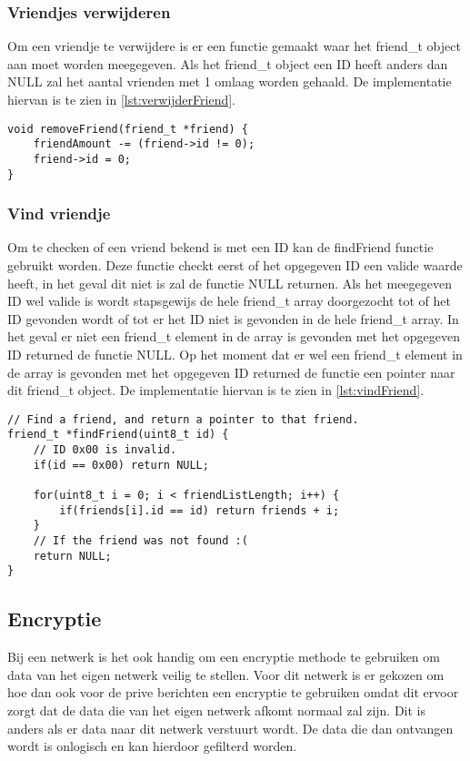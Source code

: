     \subsubsection{Vriendjes verwijderen}
        Om een vriendje te verwijdere is er een functie gemaakt waar het friend\_t object aan moet worden meegegeven. Als het friend\_t object een ID heeft anders dan NULL zal het aantal vrienden met 1 omlaag worden gehaald. De implementatie hiervan is te zien in \autoref{lst:verwijderFriend}.
        \begin{lstlisting}[caption={Verwijder vriendje},captionpos=b,label={lst:verwijderFriend},style=c,xleftmargin=.\textwidth,xrightmargin=.\textwidth]
void removeFriend(friend_t *friend) {
    friendAmount -= (friend->id != 0);
    friend->id = 0;
}
        \end{lstlisting}

    \subsubsection{Vind vriendje}
        Om te checken of een vriend bekend is met een ID kan de findFriend functie gebruikt worden. Deze functie checkt eerst of het opgegeven ID een valide waarde heeft, in het geval dit niet is zal de functie NULL returnen. Als het meegegeven ID wel valide is wordt stapsgewijs de hele friend\_t array doorgezocht tot of het ID gevonden wordt of tot er het ID niet is gevonden in de hele friend\_t array. In het geval er niet een friend\_t element in de array is gevonden met het opgegeven ID returned de functie NULL. Op het moment dat er wel een friend\_t element in de array is gevonden met het opgegeven ID returned de functie een pointer naar dit friend\_t object. De implementatie hiervan is te zien in \autoref{lst:vindFriend}.
        \begin{lstlisting}[caption={Vind vriendje},captionpos=b,label={lst:vindFriend},style=c,xleftmargin=.\textwidth,xrightmargin=.\textwidth]
// Find a friend, and return a pointer to that friend.
friend_t *findFriend(uint8_t id) {
    // ID 0x00 is invalid.   
    if(id == 0x00) return NULL;

    for(uint8_t i = 0; i < friendListLength; i++) {
        if(friends[i].id == id) return friends + i;
    }
    // If the friend was not found :(
    return NULL;
}
        \end{lstlisting}


\subsection{Encryptie}
Bij een netwerk is het ook handig om een encryptie methode te gebruiken om data van het eigen netwerk veilig te stellen.
Voor dit netwerk is er gekozen om hoe dan ook voor de prive berichten een encryptie te gebruiken omdat dit ervoor zorgt 
dat de data die van het eigen netwerk afkomt normaal zal zijn. Dit is anders als er data naar dit netwerk verstuurt wordt. De 
data die dan ontvangen wordt is onlogisch en kan hierdoor gefilterd worden. 

